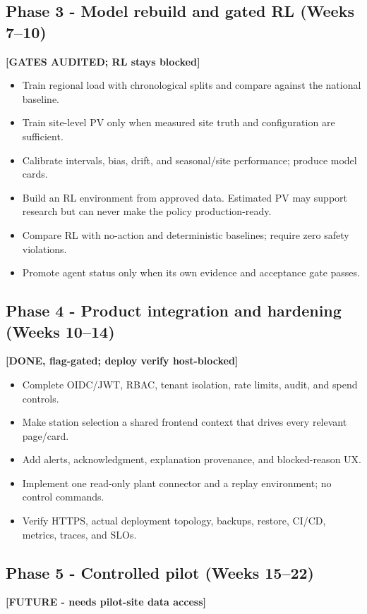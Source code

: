 \subsection{Phase 3 - Model rebuild and gated RL (Weeks 7--10)} \textbf{[GATES AUDITED; RL stays blocked]}

\begin{itemize}
  \item Train regional load with chronological splits and compare against the national baseline.
  \item Train site-level PV only when measured site truth and configuration are sufficient.
  \item Calibrate intervals, bias, drift, and seasonal/site performance; produce model cards.
  \item Build an RL environment from approved data. Estimated PV may support research but can never
        make the policy production-ready.
  \item Compare RL with no-action and deterministic baselines; require zero safety violations.
  \item Promote agent status only when its own evidence and acceptance gate passes.
\end{itemize}

\subsection{Phase 4 - Product integration and hardening (Weeks 10--14)} \textbf{[DONE, flag-gated; deploy verify host-blocked]}

\begin{itemize}
  \item Complete OIDC/JWT, RBAC, tenant isolation, rate limits, audit, and spend controls.
  \item Make station selection a shared frontend context that drives every relevant page/card.
  \item Add alerts, acknowledgment, explanation provenance, and blocked-reason UX.
  \item Implement one read-only plant connector and a replay environment; no control commands.
  \item Verify HTTPS, actual deployment topology, backups, restore, CI/CD, metrics, traces, and SLOs.
\end{itemize}

\subsection{Phase 5 - Controlled pilot (Weeks 15--22)} \textbf{[FUTURE - needs pilot-site data access]}

